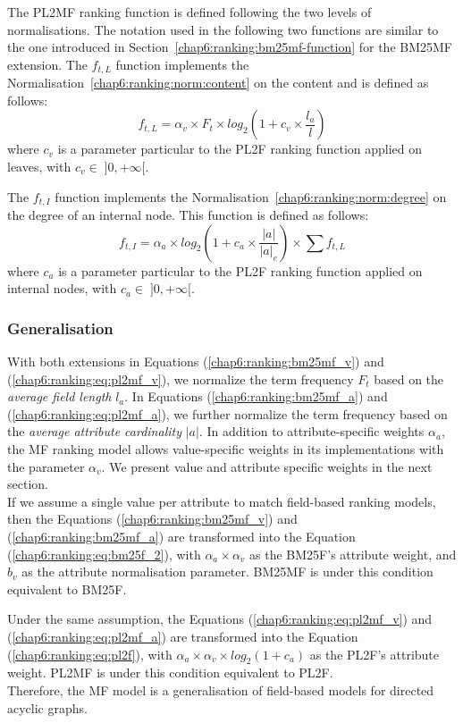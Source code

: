 The \gls{PL2MF} ranking function is defined following the two levels of normalisations. The notation used in the following two functions are similar to the one introduced in Section~\ref{chap6:ranking:bm25mf-function} for the \gls{BM25MF} extension.
The $f_{t,L}$ function implements the Normalisation~\ref{chap6:ranking:norm:content} on the content and is defined as follows:
\begin{equation}
\label{chap6:ranking:eq:pl2mf_v}
f_{t,L} = \alpha_v\times F_t \times log_2\left(1+c_v\times\frac{l_a}{l}\right)
\end{equation}
where $c_v$ is a parameter particular to the PL2F ranking function applied on leaves, with $c_v \in\; ]0,+\infty[$.

The $f_{t,I}$ function implements the Normalisation~\ref{chap6:ranking:norm:degree} on the degree of an internal node. This function is defined as follows:
\begin{equation}
\label{chap6:ranking:eq:pl2mf_a}
f_{t,I} = \alpha_a \times log_2\left(1+c_a\times\frac{\left|{a}\right|}{\left|{a}\right|_e}\right) \times \sum{f_{t,L}}
\end{equation}
where $c_a$ is a parameter particular to the PL2F ranking function applied on internal nodes, with $c_a \in\; ]0,+\infty[$.

\subsubsection{Generalisation}

With both extensions in Equations (\ref{chap6:ranking:bm25mf_v}) and (\ref{chap6:ranking:eq:pl2mf_v}), we normalize the term frequency $F_t$ based on the \emph{average field length} $l_a$. In Equations (\ref{chap6:ranking:bm25mf_a}) and (\ref{chap6:ranking:eq:pl2mf_a}), we further normalize the term frequency based on the \emph{average attribute cardinality} $\left|{a}\right|$.
In addition to attribute-specific weights $\alpha_a$, the \gls{MF} ranking model allows value-specific weights in its implementations with the parameter $\alpha_v$. We present value and attribute specific weights in the next section.\\

If we assume a single value per attribute to match field-based ranking models, then the Equations (\ref{chap6:ranking:bm25mf_v}) and (\ref{chap6:ranking:bm25mf_a}) are transformed into the Equation (\ref{chap6:ranking:eq:bm25f_2}), with $\alpha_a\times\alpha_v$ as the BM25F's attribute weight, and $b_v$ as the attribute normalisation parameter. \gls{BM25MF} is under this condition equivalent to BM25F.

Under the same assumption, the Equations (\ref{chap6:ranking:eq:pl2mf_v}) and (\ref{chap6:ranking:eq:pl2mf_a}) are transformed into the Equation (\ref{chap6:ranking:eq:pl2f}), with $\alpha_a\times\alpha_v\times log_2(1+c_a)$ as the PL2F's attribute weight. \gls{PL2MF} is under this condition equivalent to PL2F.\\

Therefore, the \gls{MF} model is a generalisation of field-based models for directed acyclic graphs.
